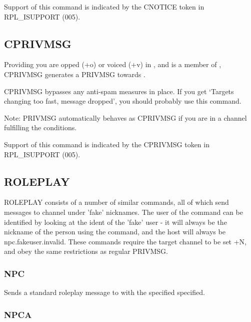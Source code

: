 	Support of this command is indicated by the CNOTICE token in
	RPL\_ISUPPORT (005).


\subsection{CPRIVMSG}

      \literal{:}

	Providing you are opped (+o) or voiced (+v) in ,
	and  is a member of , CPRIVMSG
	generates a PRIVMSG towards .

	CPRIVMSG bypasses any anti-{}spam measures in place. If you get
	`Targets changing too fast, message dropped', you should probably use
	this command.

	Note: PRIVMSG automatically behaves as CPRIVMSG	if you are in a channel
	fulfilling the conditions.

	Support of this command is indicated by the CPRIVMSG token in
	RPL\_ISUPPORT (005).


\subsection{ROLEPLAY}

	ROLEPLAY consists of a number of similar commands, all of which send
	messages to channel under 'fake' nicknames. The user of the command can
	be identified by looking at the ident of the 'fake' user - it will
	always be the nickname of the person using the command, and the host
	will always be npc.fakeuser.invalid. These commands require the target
	channel to be set +N, and obey the same restrictions as regular
	PRIVMSG.


\subsubsection{NPC}
      \literal{:} 

	Sends a standard roleplay message to  with the
	 specified specified.

\subsubsection{NPCA}
      \literal{:} 

